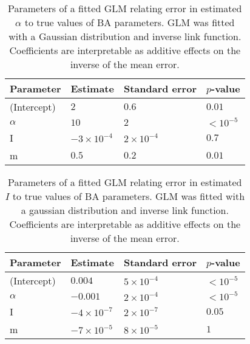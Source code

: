 \begin{table}[ht]
\centering
\begin{tabular}{llll}
  \hline
Parameter & Estimate & Standard error & $p$-value \\ 
  \hline
(Intercept) & $2$ & $0.6$ & $0.01$ \\ 
  $\alpha$ & $10$ & $2$ & ${<}10^{-5}$ \\ 
  I & $-3\!\times\!10^{-4}$ & $2\!\times\!10^{-4}$ & $0.7$ \\ 
  m & $0.5$ & $0.2$ & $0.01$ \\ 
   \hline
\end{tabular}
\caption[Parameters of a fitted GLM relating error in estimated $\alpha$ to true values of BA parameters.]{Parameters of a fitted GLM relating error in estimated $\alpha$ to true values of BA parameters. GLM was fitted with a Gaussian distribution and inverse link function. Coefficients are interpretable as additive effects on the inverse of the mean error.} 
\label{tab:glmalpha}
\end{table}
\begin{table}[ht]
\centering
\begin{tabular}{llll}
  \hline
Parameter & Estimate & Standard error & $p$-value \\ 
  \hline
(Intercept) & $0.004$ & $5\!\times\!10^{-4}$ & ${<}10^{-5}$ \\ 
  $\alpha$ & $-0.001$ & $2\!\times\!10^{-4}$ & ${<}10^{-5}$ \\ 
  I & $-4\!\times\!10^{-7}$ & $2\!\times\!10^{-7}$ & $0.05$ \\ 
  m & $-7\!\times\!10^{-5}$ & $8\!\times\!10^{-5}$ & $1$ \\ 
   \hline
\end{tabular}
\caption[Parameters of a fitted GLM relating error in estimated $I$ to true values of BA parameters.]{Parameters of a fitted GLM relating error in estimated $I$ to true values of BA parameters. GLM was fitted with a gaussian distribution and inverse link function. Coefficients are interpretable as additive effects on the inverse of the mean error.} 
\label{tab:glmI}
\end{table}

